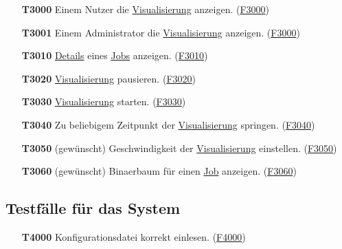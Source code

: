 \begin{itemize}
    \item[\textbf{T3000}] Einem \gls{Nutzer} die \hyperref[pages:visualization]{Visualisierung} anzeigen. (\hyperref[FA:Visualisierung:Anzeigen des Systemzustandes]{F3000})
    
    \item[\textbf{T3001}] Einem \gls{Administrator} die \hyperref[pages:visualization]{Visualisierung} anzeigen. (\hyperref[FA:Visualisierung:Anzeigen des Systemzustandes]{F3000})
    
    \item[\textbf{T3010}] \hyperref[B:Job-Details]{Details} eines \hyperref[B:Jobs]{Jobs} anzeigen. (\hyperref[FA:Visualisierung:Anzeigen von Details]{F3010})
    
    \item[\textbf{T3020}] \hyperref[pages:visualization]{Visualisierung} pausieren. (\hyperref[FA:Visualisierung:Pausieren der Visualisierung]{F3020})
    
    \item[\textbf{T3030}] \hyperref[pages:visualization]{Visualisierung} starten. (\hyperref[FA:Visualisierung:Starten der Visualisierung]{F3030})
    
    \item[\textbf{T3040}] Zu beliebigem Zeitpunkt der \hyperref[pages:visualization]{Visualisierung} springen. (\hyperref[FA:Visualisierung:Springen]{F3040})
    
    \item[\textbf{T3050}] (gewünscht) Geschwindigkeit der \hyperref[pages:visualization]{Visualisierung} einstellen. (\hyperref[FA:Visualisierung:Aendern der Wiedergabegeschwindigkeit]{F3050})
    
    \item[\textbf{T3060}] (gewünscht) \gls{Binaerbaum} für einen \hyperref[B:Jobs]{Job} anzeigen. (\hyperref[FA:Visualisierung:Anzeigen des Binaerbaumes für einen Job]{F3060})
    
\end{itemize}

\subsection{Testfälle für das System}

\begin{itemize}
    \item[\textbf{T4000}] \gls{Konfigurationsdatei} korrekt einlesen. (\hyperref[FA:System:Einstellungen festlegen]{F4000})
    

\end{itemize}

